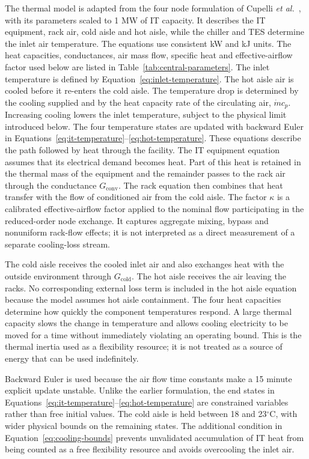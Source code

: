 The thermal model is adapted from the four node formulation of Cupelli
\emph{et al.}~\cite{cupelli2018data}, with its parameters scaled to 1 MW of IT
capacity. It describes the IT equipment, rack air,
cold aisle and hot aisle, while the chiller and TES determine the inlet air
temperature. The equations use consistent kW and kJ units. The heat capacities,
conductances, air mass flow, specific heat and effective-airflow factor used
below are listed in Table~\ref{tab:central-parameters}. The inlet
temperature is defined by Equation~\eqref{eq:inlet-temperature}.
The hot aisle air is cooled before it re-enters the cold aisle. The temperature
drop is determined by the cooling supplied and by the heat capacity rate of the
circulating air, $\dot m c_p$. Increasing cooling lowers the inlet
temperature, subject to the physical limit introduced below.
The four temperature states are updated with backward Euler in
Equations~\eqref{eq:it-temperature}--\eqref{eq:hot-temperature}.
These equations describe the path followed by heat through the facility. The IT
equipment equation assumes that its electrical demand becomes heat. Part of this
heat is retained in the thermal mass of the equipment and the remainder passes
to the rack air through the conductance $G_{\mathrm{conv}}$. The rack equation
then combines that heat transfer with the flow of conditioned air from the cold
aisle. The factor $\kappa$ is a calibrated effective-airflow factor applied to
the nominal flow participating in the reduced-order node exchange. It captures
aggregate mixing, bypass and nonuniform rack-flow effects; it is not interpreted
as a direct measurement of a separate cooling-loss stream.

The cold aisle receives the cooled inlet air and also exchanges heat with the
outside environment through $G_{\mathrm{cold}}$. The hot aisle receives the air
leaving the racks. No corresponding external loss term is included in the hot
aisle equation because the model assumes hot aisle containment. The four heat
capacities determine how quickly the component temperatures respond. A large
thermal capacity slows the change in temperature and allows cooling electricity
to be moved for a time without immediately violating an operating bound. This is
the thermal inertia used as a flexibility resource; it is not treated as a source
of energy that can be used indefinitely.

Backward Euler is used because the air flow time constants make a 15 minute
explicit update unstable. Unlike the earlier formulation, the end states in
Equations~\eqref{eq:it-temperature}--\eqref{eq:hot-temperature} are constrained
variables rather than free initial values. The cold aisle is held between
18 and 23$^{\circ}$C, with wider physical bounds on the remaining states. The
additional condition in Equation~\eqref{eq:cooling-bounds}
prevents unvalidated accumulation of IT heat from being counted as a free
flexibility resource and avoids overcooling the inlet air.

